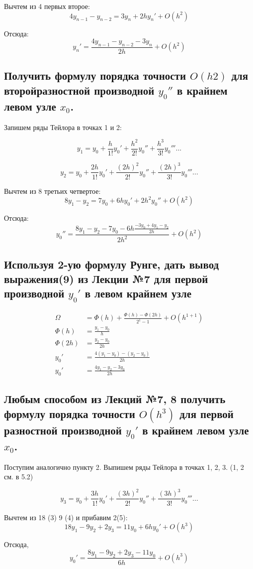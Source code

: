 \documentclass[a4paper,12pt]{article}
\begin{document}
Вычтем из 4 первых второе:
\[4y_{n-1} - y_{n-2} = 3y_n + 2h y_n' + O(h^2)\]

Отсюда:
\[y_n' = \frac{4y_{n-1} - y_{n-2} - 3y_n}{2h} + O(h^2)\]

\subsection{Получить формулу порядка точности $O(h2)$ для второйразностной производной $y_0''$ в крайнем левом  узле $x_0$.}
Запишем ряды Тейлора в точках 1 и 2:

\begin{equation}
    y_{1} = y_{0} + \frac{h}{1!}y_0' + \frac{h^2}{2!}y_0'' + \frac{h^3}{3!}y_0''' ...
\end{equation}

\begin{equation}
    y_{2} = y_{0} + \frac{2h}{1!}y_0' + \frac{(2h)^2}{2!}y_0'' + \frac{(2h)^3}{3!}y_0''' ...
\end{equation}

Вычтем из 8 третьих четвертое:
\[8y_1 - y_2 = 7y_0 + 6h y_0' + 2h^2 y_0'' + O(h^2)\]

Отсюда:
\[y_0'' = \frac{8y_1 - y_2 - 7y_0 - 6h\frac{-3y_0 + 4y_1 - y_2}{2h}}{2h^2} + O(h^2)\]

\subsection{Используя 2-ую формулу Рунге, дать вывод выражения(9) из Лекции №7 для первой производной $y_0'$ в левом крайнем узле }

\begin{align*}
    \Omega &= \Phi(h) + \frac{\Phi(h) - \Phi(2h)}{2^1-1} + O(h^{1+1}) \\
    \Phi(h) &= \frac{y_1 - y_0}{h} \\
    \Phi(2h) &= \frac{y_2 - y_0}{2h} \\
    y_0' &= \frac{4(y_1 - y_0) - (y_2 - y_0)}{2h} \\
    y_0' &= \frac{4y_1 - y_2 - 3y_0}{2h}
\end{align*}

\subsection{Любым способом из Лекций №7, 8 получить формулу порядка точности $O(h^3)$ для первой разностной производной $y_0'$ в крайнем левом  узле $x_0$.}

Поступим аналогично пункту 2. Выпишем ряды Тейлора в точках 1, 2, 3. (1, 2 см. в 5.2)

\begin{equation}
    y_{3} = y_{0} + \frac{3h}{1!}y_0' + \frac{(3h)^2}{2!}y_0'' + \frac{(3h)^3}{3!}y_0''' ...
\end{equation}

Вычтем из 18 (3) 9 (4) и прибавим 2(5):
\[18y_1 - 9y_2 + 2y_3 = 11y_0 + 6h y_0' + O(h^3)\]

Отсюда,
\[y_0' = \frac{8y_1 - 9y_2 + 2y_3 - 11y_0}{6h} + O(h^3)\]
\end{document}

